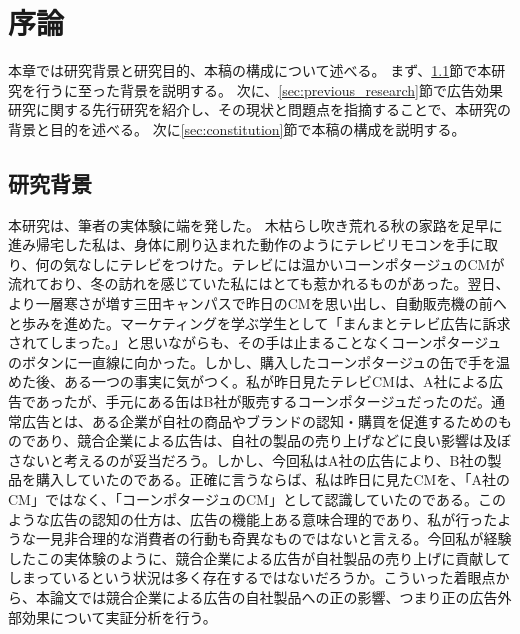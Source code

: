 \documentclass[11pt]{jsarticle}
\begin{document}
\newpage

 \setcounter{tocdepth}{3}

\tableofcontents

\newpage
{}
 \setcounter{tocdepth}{3}



\section{序論}
\label{ch:introduction}
本章では研究背景と研究目的、本稿の構成について述べる。
まず、\ref{sec:background}節で本研究を行うに至った背景を説明する。
次に、\ref{sec:previous_research}節で広告効果研究に関する先行研究を紹介し、その現状と問題点を指摘することで、本研究の背景と目的を述べる。
次に\ref{sec:constitution}節で本稿の構成を説明する。

\subsection{研究背景}
\label{sec:background}
本研究は、筆者の実体験に端を発した。 木枯らし吹き荒れる秋の家路を足早に進み帰宅した私は、身体に刷り込まれた動作のようにテレビリモコンを手に取り、何の気なしにテレビをつけた。テレビには温かいコーンポタージュのCMが流れており、冬の訪れを感じていた私にはとても惹かれるものがあった。翌日、より一層寒さが増す三田キャンパスで昨日のCMを思い出し、自動販売機の前へと歩みを進めた。マーケティングを学ぶ学生として「まんまとテレビ広告に訴求されてしまった。」と思いながらも、その手は止まることなくコーンポタージュのボタンに一直線に向かった。しかし、購入したコーンポタージュの缶で手を温めた後、ある一つの事実に気がつく。私が昨日見たテレビCMは、A社による広告であったが、手元にある缶はB社が販売するコーンポタージュだったのだ。通常広告とは、ある企業が自社の商品やブランドの認知・購買を促進するためのものであり、競合企業による広告は、自社の製品の売り上げなどに良い影響は及ぼさないと考えるのが妥当だろう。しかし、今回私はA社の広告により、B社の製品を購入していたのである。正確に言うならば、私は昨日に見たCMを、「A社のCM」ではなく、「コーンポタージュのCM」として認識していたのである。このような広告の認知の仕方は、広告の機能上ある意味合理的であり、私が行ったような一見非合理的な消費者の行動も奇異なものではないと言える。今回私が経験したこの実体験のように、競合企業による広告が自社製品の売り上げに貢献してしまっているという状況は多く存在するではないだろうか。こういった着眼点から、本論文では競合企業による広告の自社製品への正の影響、つまり正の広告外部効果について実証分析を行う。
\end{document}
